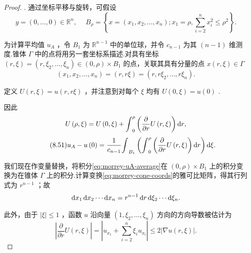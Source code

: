 \begin{proof}
. 通过坐标平移与旋转，可假设
\[
y = \left( {0,\ldots ,0}\right)  \in  {\mathbb{R}}^{n},\;\quad {B}_{\rho } = \left\{  {x = \left( {{x}_{1},{x}_{2},\ldots ,{x}_{n}}\right) ;{x}_{1} = \rho ,\sum_{{i = 2}}^{n}{x}_{i}^{2} \leq  {\rho }^{2}}\right\}  .
\]

为计算平均值 ${u}_{A}$ ，令 ${B}_{1}$ 为 ${\mathbb{R}}^{n - 1}$ 中的单位球，并令 ${c}_{n - 1}$ 为其 $\left( {n - 1}\right)$ 维测度.锥体 $\Gamma$ 中的点将用另一套坐标系描述.对具有坐标 $\left( {r,\xi }\right)  = \left( {r,{\xi }_{2},\ldots ,{\xi }_{n}}\right)  \in  \left(  {0,\rho }\right)   \times  {B}_{1}$ 的点，关联其具有分量的点 $x\left( {r,\xi }\right)  \in  \Gamma$
\begin{equation}\tag{8.50}\label{eq:morrey-cone-coords}
\left( {{x}_{1},{x}_{2},\ldots ,{x}_{n}}\right)  = \left( {r,{r\xi }}\right)  = \left( {r,r{\xi }_{2},\ldots ,r{\xi }_{n}}\right) .
\end{equation}

定义 $U\left( {r,\xi }\right)  = u\left( {r,{r\xi }}\right)$ ，并注意到对每个 $\xi$ 均有 $U\left( {0,\xi }\right)  = u\left( 0\right)$ .

因此
\[
U\left( {\rho ,\xi }\right)  = U\left( {0,\xi }\right)  + {\int }_{0}^{\rho }\left(  {\frac{\partial }{\partial r}U\left( {r,\xi }\right) }\right)  {\mathop{}\!\mathrm{d} r},
\]
\begin{equation}\tag{8.51}\label{eq:morrey-uA-average}
{u}_{A} - u\left( 0\right)  = \frac{1}{{c}_{n - 1}}{\int }_{{B}_{1}}\left( {{\int }_{0}^{\rho }\left(  {\frac{\partial }{\partial r}U\left( {r,\xi }\right) }\right)  {\mathop{}\!\mathrm{d} r}}\right) {\mathop{}\!\mathrm{d} \xi }.
\end{equation}

我们现在作变量替换，将积分\eqref{eq:morrey-uA-average}在 $\left(  {0,\rho }\right)   \times  {B}_{1}$ 上的积分变换为在锥体 $\Gamma$ 上的积分.计算变换\eqref{eq:morrey-cone-coords}的雅可比矩阵，得其行列式为 ${r}^{n - 1}$ ；故
\[
\mathop{}\!\mathrm{d} x_{1}\mathop{}\!\mathrm{d} x_{2}\cdots \mathop{}\!\mathrm{d} x_{n} = {r}^{n - 1}\mathop{}\!\mathrm{d}{r}\mathop{}\!\mathrm{d}{\xi }_{2}\cdots \mathop{}\!\mathrm{d}{\xi }_{n}.
\]

此外，由于 $\left| \xi \right|  \leq  1$ ，函数 $u$ 沿向量 $\left( {1,{\xi }_{2},\ldots ,{\xi }_{n}}\right)$ 方向的方向导数被估计为
\begin{equation}\tag{8.52}\label{eq:morrey-dUr-bound}
\left| {\frac{\partial }{\partial r}U\left( {r,\xi }\right) }\right|  = \left| {{u}_{{x}_{1}} + \sum_{{i = 2}}^{n}{\xi }_{i}{u}_{{x}_{i}}}\right|  \leq  2\left| {\nabla u\left( {r,\xi }\right) }\right| .
\end{equation}


\end{proof}
